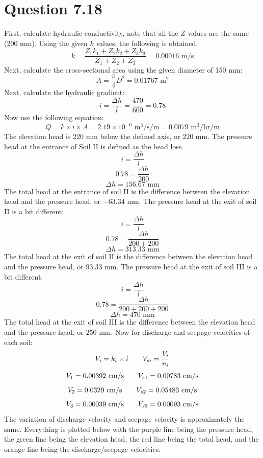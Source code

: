 \documentclass{article}
\begin{document}
\section*{Question 7.18} 
First, calculate hydraulic conductivity, note that all the $Z$ values are the same (200 mm). Using the given $k$ values, the following is obtained.
\[k=\frac{Z_1k_1+Z_2k_2+Z_3k_3}{Z_1+Z_2+Z_3}=0.00016 \text{ m/s}\] 
Next, calculate the cross-sectional area using the given diameter of 150 mm: 
\[A=\frac{\pi}{4}D^2=0.01767 \text{ m}^2\]
Next, calculate the hydraulic gradient: 
\[i=\frac{\Delta h}{l}=\frac{470}{600}=0.78\]
Now use the following equation: 
\[Q= k\times i \times A = 2.19\times 10^{-6} \text{ m}^3\text{/s/m}=\boxed{0.0079\text{ m}^3\text{/hr/m}}\]
The elevation head is 220 mm below the defined axis, or $\boxed{220\text{ mm}}$. The pressure head at the entrance of Soil II is defined as the head loss. 
\[i=\frac{\Delta h}{l}\]
\[0.78=\frac{\Delta h}{200}\] 
\[\Delta h = \boxed{156.67\text{ mm}}\]
The total head at the entrance of soil II is the difference between the elevation head and the pressure head, or $\boxed{-63.34\text{ mm}}$. The pressure head at the exit of soil II is a bit different: 
\[i=\frac{\Delta h}{l}\]
\[0.78=\frac{\Delta h}{200+200}\] 
\[\Delta h = \boxed{313.33\text{ mm}}\]
The total head at the exit of soil II is the difference between the elevation head and the pressure head, or $\boxed{93.33\text{ mm}}$. The pressure head at the exit of soil III is a bit different.
\[i=\frac{\Delta h}{l}\]
\[0.78=\frac{\Delta h}{200+200+200}\] 
\[\Delta h = \boxed{470\text{ mm}}\]
The total head at the exit of soil III is the difference between the elevation head and the pressure head, or $\boxed{250\text{ mm}}$. Now for discharge and seepage velocities of each soil: 
\[V_i = k_i\times i\hspace{7mm}V_{si}=\frac{V_i}{n_i}\]
\[V_1 = 0.00392\text{ cm/s}\hspace{7mm}V_{s1}=0.00783\text{ cm/s}\]
\[V_2 = 0.0329\text{ cm/s}\hspace{7mm}V_{s2}=0.05483\text{ cm/s}\]
\[V_3 = 0.00039\text{ cm/s}\hspace{7mm}V_{s3}=0.00093\text{ cm/s}\]
The variation of discharge velocity and seepage velocity is approximately the same. Everything is plotted below with the purple line being the pressure head, the green line being the elevation head, the red line being the total head, and the orange line being the discharge/seepage velocities.
\end{document}

